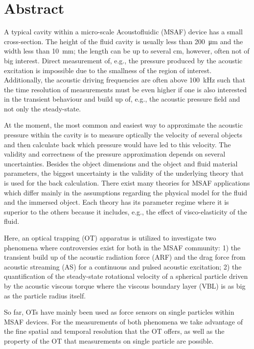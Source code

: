 \chapter*{Abstract} 

A typical cavity within a micro-scale Acoustofluidic (MSAF) device has a small 
cross-section. The height of the fluid cavity is usually less than 
\SI{200}{\um} and the width less than \SI{10}{\mm}; the length can be up to 
several \si{\cm}, however, often not of big interest. Direct measurement of, 
e.g., the pressure produced by the acoustic excitation is impossible due to the 
smallness of the region of interest. Additionally, the acoustic driving 
frequencies are often above \SI{100}{\kilo\hertz} such that the time resolution 
of measurements must be even higher if one is also interested in the transient 
behaviour and build up of, e.g., the acoustic pressure field and not only the 
steady-state.

At the moment, the most common and easiest way to approximate the acoustic 
pressure within the cavity is to measure optically the velocity of several 
objects and then calculate back which pressure would have led to this velocity. 
The validity and correctness of the pressure approximation depends on several 
uncertainties. Besides the object dimensions and the object and fluid material 
parameters, the biggest uncertainty is the validity of the underlying theory 
that is used for the back calculation. There exist many theories for MSAF 
applications which differ mainly in the assumptions regarding the physical 
model for the fluid and the immersed object. Each theory has its parameter 
regime where it is superior to the others because it includes, e.g., the effect 
of visco-elasticity of the fluid.

Here, an optical trapping (OT) apparatus is utilized to investigate two 
phenomena where controversies exist for both in the MSAF community: 1) the 
transient build up of the acoustic radiation force (ARF) and the drag force 
from acoustic streaming (AS) for a continuous and pulsed acoustic excitation; 
2) the quantification of the steady-state rotational velocity of a spherical 
particle driven by the acoustic viscous torque where the viscous boundary layer 
(VBL) is as big as the particle radius itself.

So far, OTs have mainly been used as force sensors on single particles within 
MSAF devices. For the measurements of both phenomena we take advantage of the 
fine spatial and temporal resolution that the OT offers, as well as the 
property of the OT that measurements on single particle are possible.

